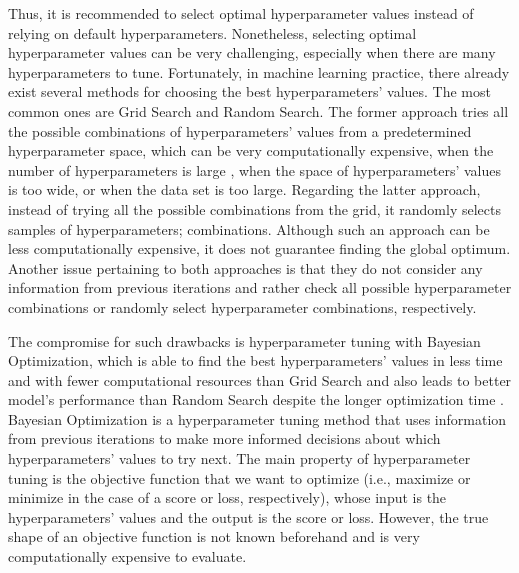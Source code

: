 Thus, it is recommended to select optimal hyperparameter values instead of relying on default hyperparameters.
Nonetheless, selecting optimal hyperparameter values can be very challenging, especially when there are many hyperparameters to tune.
Fortunately, in machine learning practice, there already exist several methods for choosing the best hyperparameters' values. The most common ones are Grid Search and Random Search.
The former approach tries all the possible combinations of hyperparameters' values from a predetermined hyperparameter space, which can be very computationally expensive, when the number of hyperparameters is large \citep{marinov2019hyperparameter}, when the space of hyperparameters' values is too wide, or when the data set is too large.
Regarding the latter approach, instead of trying all the possible combinations from the grid, it randomly selects samples of hyperparameters; combinations. Although such an approach can be less computationally expensive, it does not guarantee finding the global optimum.
Another issue pertaining to both approaches is that they do not consider any information from previous iterations and rather check all possible hyperparameter combinations or randomly select hyperparameter combinations, respectively.

The compromise for such drawbacks is hyperparameter tuning with Bayesian Optimization, which is able to find the best hyperparameters' values in less time and with fewer computational resources than Grid Search and also leads to better model's performance than Random Search despite the longer optimization time \citep{drahokoupil2022application}.
Bayesian Optimization is a hyperparameter tuning method that uses information from previous iterations to make more informed decisions about which hyperparameters' values to try next.
The main property of hyperparameter tuning is the objective function that we want to optimize (i.e., maximize or minimize in the case of a score or loss, respectively), whose input is the hyperparameters' values and the output is the score or loss. However, the true shape of an objective function is not known beforehand and is very computationally expensive to evaluate.



